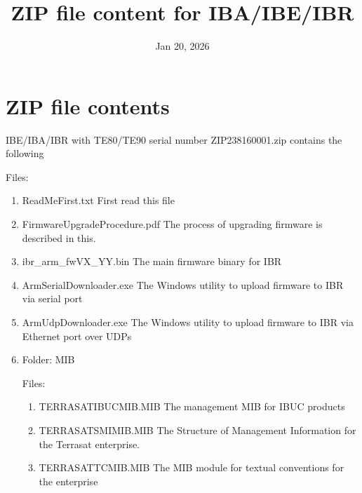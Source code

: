\documentclass[letterpaper,10pt,english]{sphinxhowto}
\title{ZIP file content for IBA/IBE/IBR}
\date{Jan 20, 2026}
\author{}
\begin{document}
\pagestyle{empty}

\pagestyle{plain}

\pagestyle{normal}
\label{\detokenize{index::doc}}


\sphinxstepscope


\section{ZIP file contents}
\label{\detokenize{topics/zip_contents:zip-file-contents}}\label{\detokenize{topics/zip_contents::doc}}
\sphinxAtStartPar
IBE/IBA/IBR with TE80/TE90 serial number ZIP\sphinxhyphen{}23816\sphinxhyphen{}0001.zip contains the following

\sphinxAtStartPar
Files:
\begin{enumerate}
%
\item {} 
\sphinxAtStartPar
ReadMeFirst.txt \sphinxhyphen{} First read this file

\item {} 
\sphinxAtStartPar
FirmwareUpgradeProcedure.pdf \sphinxhyphen{} The process of upgrading firmware is described in this.

\item {} 
\sphinxAtStartPar
ibr\_arm\_fwVX\_YY.bin \sphinxhyphen{} The main firmware binary for IBR

\item {} 
\sphinxAtStartPar
ArmSerialDownloader.exe \sphinxhyphen{} The Windows utility to upload firmware to IBR via serial port

\item {} 
\sphinxAtStartPar
ArmUdpDownloader.exe \sphinxhyphen{} The Windows utility to upload firmware to IBR via Ethernet port over UDPs

\item {} 
\sphinxAtStartPar
Folder: MIB

\sphinxAtStartPar
Files:
\begin{enumerate}
%
\item {} 
\sphinxAtStartPar
TERRASAT\sphinxhyphen{}IBUC\sphinxhyphen{}MIB.MIB \sphinxhyphen{} The management MIB for IBUC products

\item {} 
\sphinxAtStartPar
TERRASAT\sphinxhyphen{}SMI\sphinxhyphen{}MIB.MIB  \sphinxhyphen{} The Structure of Management Information for the Terrasat enterprise.

\item {} 
\sphinxAtStartPar
TERRASAT\sphinxhyphen{}TC\sphinxhyphen{}MIB.MIB   \sphinxhyphen{} The MIB module for textual conventions for the enterprise

\end{enumerate}

\end{enumerate}



\renewcommand{\indexname}{Index}
\printindex
\end{document}
